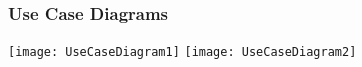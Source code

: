 \subsubsection{Use Case Diagrams}
\graphicspath{{3Specific_Requirements/res/}}
\centering
\texttt{[image: UseCaseDiagram1]}
\vspace*{3cm}
\texttt{[image: UseCaseDiagram2]}
